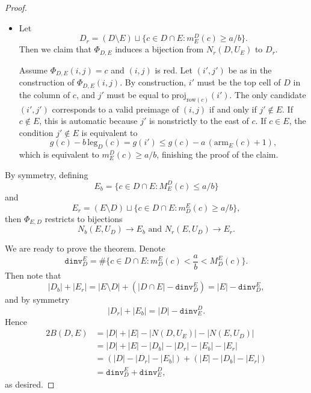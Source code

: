 \documentclass[11pt,reqno]{amsart}
\theoremstyle{remark}
\begin{document}
\begin{proof}
\begin{itemize}
        The only candidate preimage $(i,j)$ is valid if and only if $i\in D$. This is equivalent to
        \[ g(c)-b\,(\mathrm{leg}_E+1)= g(j)\geq g(c)-a\, \mathrm{arm}_D(c),\]
        which is equivalent to $M^E_D(c)\leq a/b$, proving the claim.

        \item Let
        \[ D_r = (D\setminus E) \sqcup \{c\in D\cap E:m^D_E(c)\geq a/b\}.\]
        Then we claim that $\Phi_{D,E}$ induces a bijection from $N_r(D,U_E)$ to $D_r$.
        
        Assume $\Phi_{D,E}(i,j)=c$ and $(i,j)$ is red. Let $(i',j')$ be as in the construction of $\Phi_{D,E}(i,j)$. By construction, $i'$ must be the top cell of $D$ in the column of $c$, and $j'$ must be equal to $\mathrm{proj}_{\mathrm{row}(c)}(i')$. The only candidate $(i',j')$ corresponds to a valid preimage of $(i,j)$ if and only if $j'\notin E$. If $c\notin E$, this is automatic because $j'$ is nonstrictly to the east of $c$. If $c\in E$, the condition $j'\notin E$ is equivalent to 
        \[ g(c)-b\,\mathrm{leg}_D(c)=g(i')\leq g(c)-a\,(\mathrm{arm}_E(c)+1),\]
        which is equivalent to $m^D_E(c)\geq a/b$, finishing the proof of the claim.
    \end{itemize}

    By symmetry, defining
    \[ E_b=\{c\in D\cap E:M^D_E(c)\leq a/b\}\]
    and
    \[ E_r = (E\setminus D) \sqcup \{c\in D\cap E:m^E_D(c)\geq a/b\},\]
    then $\Phi_{E,D}$ restricts to bijections
    \[ N_b(E,U_D)\to E_b \text{ and }N_r(E,U_D)\to E_r.\]

    We are ready to prove the theorem. Denote 
    \[ \mathtt{dinv}^E_D=\#\{c\in D\cap E:m^E_D(c)<\frac{a}{b}<M^E_D(c)\}.\]
    Then note that
    \[ |D_b|+|E_r|=|E\setminus D|+(|D\cap E|-\mathtt{dinv}^E_D)=|E|-\mathtt{dinv}^E_D,\]
    and by symmetry
    \[ |D_r|+|E_b|=|D|-\mathtt{dinv}^D_E.\]
    Hence
    \begin{align*}
        2B(D,E)&=|D|+|E|-|N(D,U_E)|-|N(E,U_D)|\\
        &=|D|+|E|-|D_b|-|D_r|-|E_b|-|E_r|\\
        &=(|D|-|D_r|-|E_b|)+(|E|-|D_b|-|E_r|)\\
        &=\mathtt{dinv}^E_D + \mathtt{dinv}^D_E,
    \end{align*}
    as desired.
\end{proof}
\end{document}

